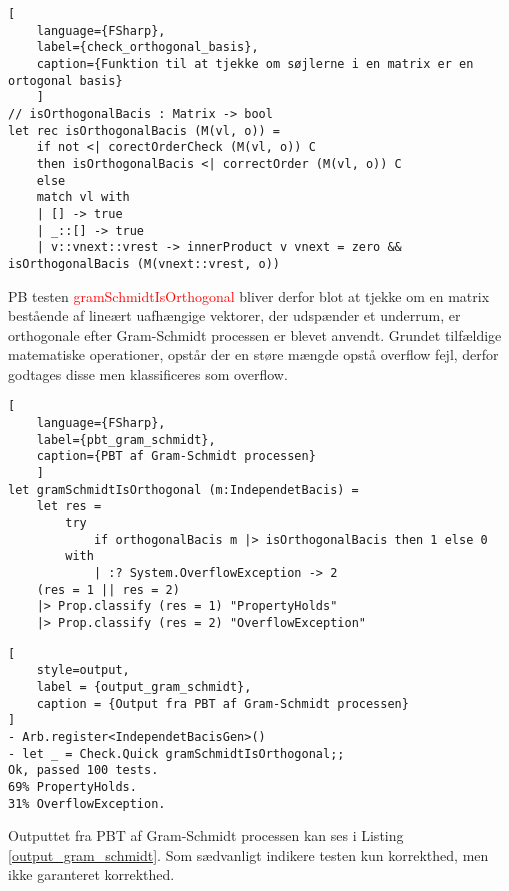 \begin{lstlisting}[
    language={FSharp}, 
    label={check_orthogonal_basis}, 
    caption={Funktion til at tjekke om søjlerne i en matrix er en ortogonal basis}
    ]
// isOrthogonalBacis : Matrix -> bool
let rec isOrthogonalBacis (M(vl, o)) =
    if not <| corectOrderCheck (M(vl, o)) C 
    then isOrthogonalBacis <| correctOrder (M(vl, o)) C
    else
    match vl with
    | [] -> true
    | _::[] -> true
    | v::vnext::vrest -> innerProduct v vnext = zero && isOrthogonalBacis (M(vnext::vrest, o))
\end{lstlisting}

PB testen \textcolor{red}{gramSchmidtIsOrthogonal} bliver derfor blot at tjekke om en matrix bestående af lineært uafhængige vektorer, der udspænder et underrum, er orthogonale efter Gram-Schmidt processen er blevet anvendt. Grundet tilfældige matematiske operationer, opstår der en støre mængde opstå overflow fejl, derfor godtages disse men klassificeres som overflow.

\begin{lstlisting}[
    language={FSharp}, 
    label={pbt_gram_schmidt}, 
    caption={PBT af Gram-Schmidt processen}
    ]
let gramSchmidtIsOrthogonal (m:IndependetBacis) =
    let res =
        try 
            if orthogonalBacis m |> isOrthogonalBacis then 1 else 0
        with
            | :? System.OverflowException -> 2
    (res = 1 || res = 2)
    |> Prop.classify (res = 1) "PropertyHolds"
    |> Prop.classify (res = 2) "OverflowException"
\end{lstlisting}

\begin{lstlisting}[
    style=output,
    label = {output_gram_schmidt},
    caption = {Output fra PBT af Gram-Schmidt processen}
]
- Arb.register<IndependetBacisGen>()
- let _ = Check.Quick gramSchmidtIsOrthogonal;;
Ok, passed 100 tests.
69% PropertyHolds.
31% OverflowException.
\end{lstlisting}

Outputtet fra PBT af Gram-Schmidt processen kan ses i Listing \ref{output_gram_schmidt}. Som sædvanligt indikere testen kun korrekthed, men ikke garanteret korrekthed.

